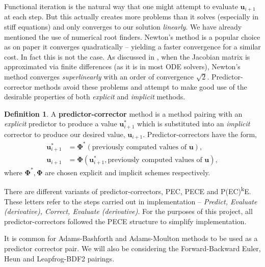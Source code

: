 \documentclass[12pt, twoside]{report}
\theoremstyle{plain}
\theoremstyle{definition}
\newtheorem{definition}{Definition}[chapter]
\theoremstyle{definition}
\begin{document}
        Functional iteration is the natural way that one might attempt to 
        evaluate $\mathbf{u}_{i+1}$ at each step. But this actually creates
        more problems than it solves (especially in stiff equations) and only 
        converges to our solution \textit{linearly}. We have already mentioned
        the use of numerical root finders. Newton's method is a popular choice 
        as on paper it converges quadratically -- yielding a faster convergence 
        for a similar cost. In fact this is not the case. As discussed in 
        \cite{press}, when the Jacobian matrix is approximated via finite 
        differences (as it is in most ODE solvers), Newton's method converges 
        \textit{superlinearly} with an order of convergence $\sqrt{2}$. 
        Predictor-corrector methods avoid these problems and attempt to make 
        good use of the desirable properties of both \textit{explicit} and 
        \textit{implicit} methods.

        \begin{definition}
        \label{2_pc_method}
            A \textbf{predictor-corrector} method is a method pairing with 
            an \textit{explicit} predictor to produce a value 
            $\mathbf{u}_{i+1}^*$ which is substituted into an 
            \textit{implicit} corrector to produce our desired value, 
            $\mathbf{u}_{i+1}$. Predictor-correctors have the form,
            \begin{align}
                \mathbf{u}_{i+1}^* &= \boldsymbol\Phi^* (\text{
                previously computed values of }\mathbf{u}),\\
                \mathbf{u}_{i+1} &= \boldsymbol\Phi(\mathbf u_{i+1}^*, 
                \text{previously computed values of }\mathbf u),
            \end{align}
            where $\boldsymbol\Phi^*, \boldsymbol\Phi $ are chosen explicit 
            and implicit schemes respectively.
        \end{definition}

        There are different variants of predictor-correctors, PEC, PECE and 
        P(EC)\textsuperscript{k}E. These letters refer to the steps carried 
        out in implementation -- \textit{Predict, Evaluate (derivative), 
        Correct, Evaluate (derivative)}. For the purposes of this project, all 
        predictor-correctors followed the PECE structure to simplify 
        implementation.

        It is common for Adams-Bashforth and Adams-Moulton methods to be used
        as a predictor corrector pair. We will also be considering the 
        Forward-Backward Euler, Heun and Leapfrog-BDF2 pairings.
\end{document}

